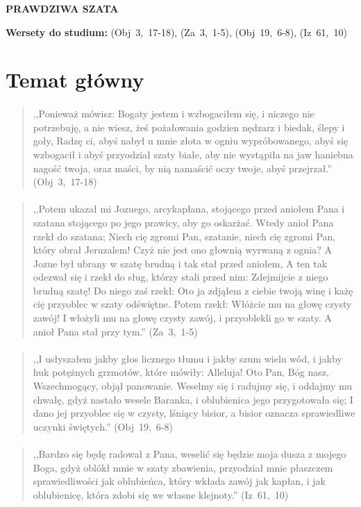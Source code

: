 \documentclass[10pt,a4paper,oneside]{article}
\begin{document}
\centerline{\textbf{\MakeUppercase{Prawdziwa szata}}}
\begin{center}
\textbf{Wersety do studium:} \mbox{(Obj 3, 17-18)}, \mbox{(Za 3, 1-5)}, \mbox{(Obj 19, 6-8)}, \mbox{(Iz 61, 10)}
\end{center}
\section{Temat główny}
\paragraph{}
\begin{quote}
,,Ponieważ mówisz: Bogaty jestem i wzbogaciłem się, i niczego nie potrzebuję, a nie wiesz, żeś pożałowania godzien nędzarz i biedak, ślepy i goły, Radzę ci, abyś nabył u mnie złota w ogniu wypróbowanego, abyś się wzbogacił i abyś przyodział szaty białe, aby nie wystąpiła na jaw haniebna nagość twoja, oraz maści, by nią namaścić oczy twoje, abyś przejrzał.'' \mbox{(Obj 3, 17-18)}
\end{quote}
\paragraph{}
\begin{quote}
,,Potem ukazał mi Jozuego, arcykapłana, stojącego przed aniołem Pana i szatana stojącego po jego prawicy, aby go oskarżać. Wtedy anioł Pana rzekł do szatana; Niech cię zgromi Pan, szatanie, niech cię zgromi Pan, który obrał Jeruzalem! Czyż nie jest ono głownią wyrwaną z ognia? A Jozue był ubrany w szatę brudną i tak stał przed aniołem, A ten tak odezwał się i rzekł do sług, którzy stali przed nim: Zdejmijcie z niego brudną szatę! Do niego zaś rzekł: Oto ja zdjąłem z ciebie twoją winę i każę cię przyoblec w szaty odświętne. Potem rzekł: Włóżcie mu na głowę czysty zawój! I włożyli mu na głowę czysty zawój, i przyoblekli go w szaty. A anioł Pana stał przy tym.'' \mbox{(Za 3, 1-5)}
\end{quote}
\paragraph{}
\begin{quote}
,,I usłyszałem jakby głos licznego tłumu i jakby szum wielu wód, i jakby huk potężnych grzmotów, które mówiły: Alleluja! Oto Pan, Bóg nasz, Wszechmogący, objął panowanie. Weselmy się i radujmy się, i oddajmy mu chwałę, gdyż nastało wesele Baranka, i oblubienica jego przygotowała się; I dano jej przyoblec się w czysty, lśniący bisior, a bisior oznacza sprawiedliwe uczynki świętych.'' \mbox{(Obj 19, 6-8)}
\end{quote}
\paragraph{}
\begin{quote}
,,Bardzo się będę radował z Pana, weselić się będzie moja dusza z mojego Boga, gdyż oblókł mnie w szaty zbawienia, przyodział mnie płaszczem sprawiedliwości jak oblubieńca, który wkłada zawój jak kapłan, i jak oblubienicę, która zdobi się we własne klejnoty.'' \mbox{(Iz 61, 10)}
\end{quote}
\end{document}
